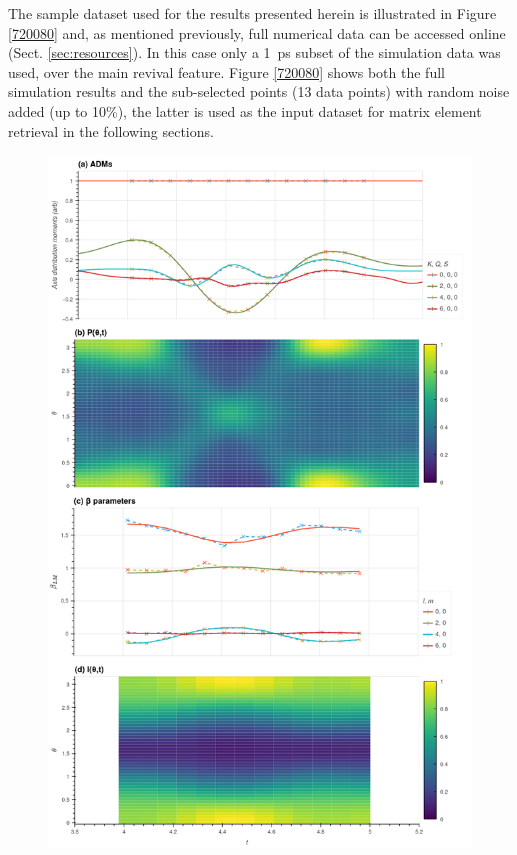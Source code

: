 \documentclass[10pt]{article}
\begin{document}
The sample dataset used for the results presented herein is illustrated in Figure \ref{720080} and, as mentioned previously, full numerical data can be accessed online (Sect. \ref{sec:resources}). In this case only a 1~ps subset of the simulation data was used, over the main revival feature. Figure \ref{720080} shows both the full simulation results and the sub-selected points (13 data points) with random noise added (up to 10\%), the latter is used as the input dataset for matrix element retrieval in the following sections. %




\begin{figure}[]
\begin{center}
\includegraphics[width=\textwidth,height=\dimexpr\textheight-4\baselineskip-\abovecaptionskip-\belowcaptionskip\relax,keepaspectratio]{figures/dataDump_1000fitTests_multiFit_noise_051021_data4up_090323_19-37-14.png}

\end{center}
\end{figure}
\end{document}
